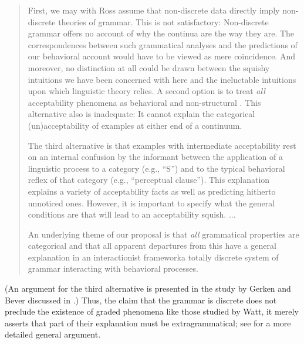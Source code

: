 \begin{quote}
First, we may with Ross assume that non-discrete data directly imply non-discrete theories of grammar. This is not satisfactory: Non-discrete grammar offers no account of why the continua are the way they are. The correspondences between such grammatical analyses and the predictions of our behavioral account would have to be viewed as mere coincidence. And moreover, no distinction at all could be drawn between the squishy intuitions we have been concerned with here and the ineluctable intuitions upon which linguistic theory relies. A second option is to treat \textit{all} acceptability phenomena as behavioral and non-structural \citep{ClarkEtAl1974}. This alternative also is inadequate: It cannot explain the categorical (un)accepta\-bility of examples at either end of a continuum.



The third alternative is that examples with intermediate acceptability rest on an internal confusion by the informant between the application of a linguistic process to a category (e.g., ``S'') and to the typical behavioral reflex of that category (e.g., ``perceptual clause''). This explanation explains a variety of acceptability facts as well as predicting hitherto unnoticed ones. However, it is important to specify what the general conditions are that will lead to an acceptability squish. ...

An underlying theme of our proposal is that \textit{all} grammatical properties are categorical and that all apparent departures from this have a general explanation in an interactionist framework\schdash{}a totally discrete system of grammar interacting with behavioral processes.  \citep[232--323]{BeverEtAl1981}
\end{quote}


\noindent
(An argument for the third alternative is presented in the study by Gerken and Bever discussed in .) Thus, the claim that the grammar is discrete does not preclude the existence of graded phenomena like those studied by Watt, it merely asserts that part of their explanation must be extragrammatical; see \citet{KatzEtAl1976} for a more detailed general argument.

